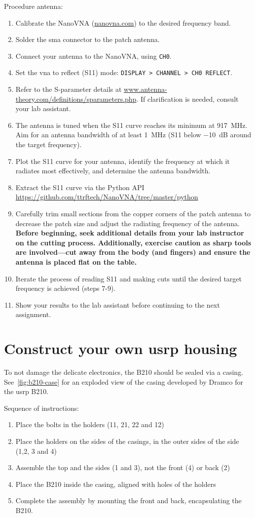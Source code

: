 Procedure antenna:
\begin{enumerate}
    \item Calibrate the NanoVNA (\url{nanovna.com}) to the desired frequency band.
    \item Solder the \gls{sma} connector to the patch antenna.
    \item  Connect your antenna to the NanoVNA, using \texttt{CH0}.
    \item Set the \gls{vna} to reflect (S11) mode: \texttt{DISPLAY > CHANNEL > CH0 REFLECT}.
    \item Refer to the S-parameter details at \url{www.antenna-theory.com/definitions/sparameters.php}. If clarification is needed, consult your lab assistant.
    \item The antenna is tuned when the S11 curve reaches its minimum at \SI{917}{\mega\hertz}. Aim for an antenna bandwidth of at least \SI{1}{\mega\hertz} (S11 below \SI{-10}{dB} around the target frequency).
\item Plot the S11 curve for your antenna, identify the frequency at which it radiates most effectively, and determine the antenna bandwidth.
\item Extract the S11 curve via the Python API \url{https://github.com/ttrftech/NanoVNA/tree/master/python}
\item Carefully trim small sections from the copper corners of the patch antenna to decrease the patch size and adjust the radiating frequency of the antenna. \textbf{Before beginning, seek additional details from your lab instructor on the cutting process. Additionally, exercise caution as sharp tools are involved—cut away from the body (and fingers) and ensure the antenna is placed flat on the table.}
\item Iterate the process of reading S11 and making cuts until the desired target frequency is achieved (steps 7-9).
\item Show your results to the lab assistant before continuing to the next assignment.
\end{enumerate}


\section{Construct your own \gls{usrp} housing}
To not damage the delicate electronics, the B210 should be sealed via a casing. See~\cref{fig:b210-case} for an exploded view of the casing developed by Dramco for the \gls{usrp} B210. 

Sequence of instructions:
\begin{enumerate}
    \item Place the bolts in the holders (11, 21, 22 and 12)
    \item Place the holders on the sides of the casings, in the outer sides of the side (1,2, 3 and 4)
    \item Assemble the top and the sides (1 and 3), not the front (4) or back (2)
    \item Place the B210 inside the casing, aligned with holes of the holders
    \item Complete the assembly by mounting the front and back, encapsulating the B210.
\end{enumerate}

